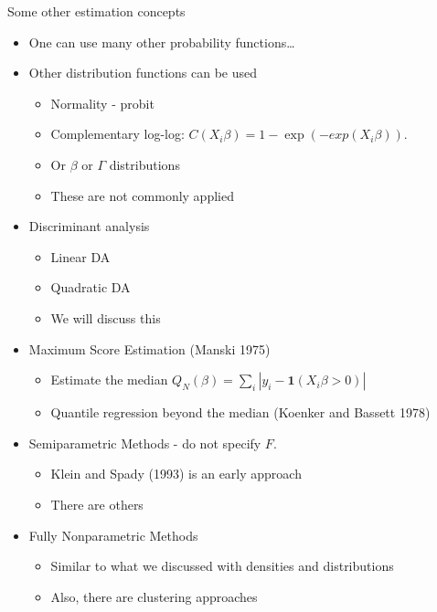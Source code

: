 \documentclass[
  ignorenonframetext,
]{beamer}
\providecommand{\tightlist}{%
  \setlength{\itemsep}{0pt}\setlength{\parskip}{0pt}}
\begin{document}
\begin{frame}[allowframebreaks]{Some other estimation concepts}
\protect{}\label{some-other-estimation-concepts}
\begin{itemize}
\item
  One can use many other probability functions\ldots{}
\item
  Other distribution functions can be used

  \begin{itemize}
  \tightlist
  \item
    Normality - probit
  \item
    Complementary log-log: \(C(X_i\beta) = 1-\exp(-exp(X_i\beta))\).
  \item
    Or \(\beta\) or \(\Gamma\) distributions
  \item
    These are not commonly applied
  \end{itemize}
\item
  Discriminant analysis

  \begin{itemize}
  \tightlist
  \item
    Linear DA
  \item
    Quadratic DA
  \item
    We will discuss this
  \end{itemize}
\item
  Maximum Score Estimation (Manski 1975)

  \begin{itemize}
  \tightlist
  \item
    Estimate the median
    \(Q_N(\beta) = \sum_i |y_i-\mathbf{1}(X_i\beta>0)|\)
  \item
    Quantile regression beyond the median (Koenker and Bassett 1978)
  \end{itemize}
\item
  Semiparametric Methods - do not specify \(F\).

  \begin{itemize}
  \tightlist
  \item
    Klein and Spady (1993) is an early approach
  \item
    There are others
  \end{itemize}
\item
  Fully Nonparametric Methods

  \begin{itemize}
  \tightlist
  \item
    Similar to what we discussed with densities and distributions
  \item
    Also, there are clustering approaches
  \end{itemize}
\end{itemize}
\end{frame}
\end{document}
